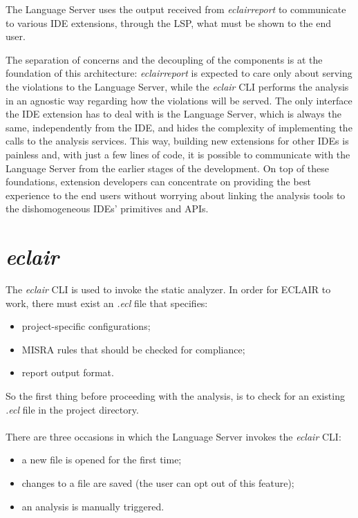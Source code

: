 The Language Server uses the output received from \emph{eclair\textunderscore	report} to communicate to various IDE extensions, through the LSP, what must be shown to the end user. 

The separation of concerns and the decoupling of the components is at the foundation of this architecture: \emph{eclair\textunderscore	report} is expected to care only about serving the violations to the Language Server, while the \emph{eclair} CLI performs the analysis in an agnostic way regarding how the violations will be served. The only interface the IDE extension has to deal with is the Language Server, which is always the same, independently from the IDE, and hides the complexity of implementing the calls to the analysis services. This way, building new extensions for other IDEs is painless and, with just a few lines of code, it is possible to communicate with the Language Server from the earlier stages of the development. On top of these foundations, extension developers can concentrate on providing the best experience to the end users without worrying about linking the analysis tools to the dishomogeneous IDEs' primitives and APIs.

\section{\emph{eclair}}\label{sec:cap_sec_subsec}
The \emph{eclair} CLI is used to invoke the static analyzer. In order for ECLAIR to work, there must exist an \emph{.ecl} file that specifies:
\begin{itemize}
  \item project-specific configurations;
  \item MISRA rules that should be checked for compliance;
  \item report output format.
\end{itemize}

So the first thing before proceeding with the analysis, is to check for an existing \emph{.ecl} file in the project directory.
\\\\
There are three occasions in which the Language Server invokes the \emph{eclair} CLI:
\begin{itemize}
  \item a new file is opened for the first time;
  \item changes to a file are saved (the user can opt out of this feature);
  \item an analysis is manually triggered.
\end{itemize}

